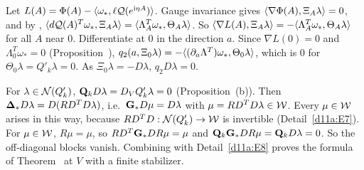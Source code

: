 \begin{detail}\label{d11a:E9}
\begin{step}[$q_2D\lambda=0$ for $\lambda\in\cN(Q'_k)$]
Let $L(A)=\Phi(A)-\langle \omega_*,\ell\mathcal Q(e^{\mathrm i\eta A})\rangle$. Gauge invariance gives $\langle \nabla\Phi(A),\Xi_A\lambda\rangle=0$, and by , $\langle d\mathcal Q(A)^T\omega_*,\Xi_A\lambda\rangle=\langle \Lambda_A^T\omega_*,\Theta_A\lambda\rangle$. So $\langle \nabla L(A),\Xi_A\lambda\rangle=-\langle \Lambda_A^T\omega_*,\Theta_A\lambda\rangle$ for all $A$ near $0$. Differentiate at $0$ in the direction $a$. Since $\nabla L(0)=0$ and $\Lambda_0^T\omega_*=0$ (Proposition~), $q_2(a,\Xi_0\lambda)=-\langle (\partial_a\Lambda^T)\omega_*,\Theta_0\lambda\rangle$, which is $0$ for $\Theta_0\lambda=Q'_k\lambda=0$. As $\Xi_0\lambda=-D\lambda$, $q_2D\lambda=0$.
\end{step}
\begin{step}[$\mathcal C\bG_*\mathcal C^T=\bQ_k\bG_*\bQ_k^T\oplus I_\cW$]
For $\lambda\in\cN(Q'_k)$, $\mathbf Q_kD\lambda=D_VQ'_k\lambda=0$ (Proposition~(b)). Then $\boldsymbol{\Delta}_*D\lambda=D(RD^TD\lambda)$, i.e.\ $\mathbf G_*D\mu=D\lambda$ with $\mu=RD^TD\lambda\in\mathcal W$. Every $\mu\in\mathcal W$ arises in this way, because $RD^TD:\mathcal N(Q'_k)\to\mathcal W$ is invertible (Detail~\ref{d11a:E7}). For $\mu\in\mathcal W$, $R\mu=\mu$, so $RD^T\mathbf G_*DR\mu=\mu$ and $\mathbf Q_k\mathbf G_*DR\mu=\mathbf Q_kD\lambda=0$. So the off-diagonal blocks vanish. Combining with Detail~\ref{d11a:E8} proves the formula of Theorem~ at $V$ with a finite stabilizer.
\end{step}
\end{detail}

